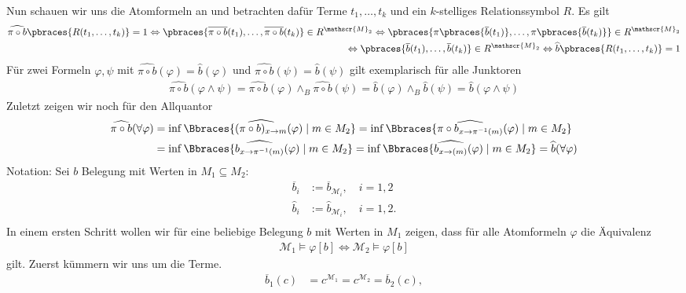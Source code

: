 \begin{solution}
	Nun schauen wir uns die Atomformeln an und betrachten dafür Terme $t_1, \dots, t_k$ und ein $k$-stelliges Relationssymbol $R$. Es gilt 
	\begin{align*}
	\widehat{\pi \circ b}\pbraces{R(t_1, \dots, t_k)} = 1 \Leftrightarrow \pbraces{\overline{\pi \circ b}(t_1), \dots, \overline{\pi \circ b}(t_k)} \in R^{\mathscr{M}_2} \Leftrightarrow \pbraces{\pi\pbraces{\overline{b}(t_1)}, \dots, \pi \pbraces{\overline{b}(t_k)}} \in R^{\mathscr{M}_2} \\
	\Leftrightarrow \pbraces{\overline{b}(t_1), \dots, \overline{b}(t_k)} \in R^{\mathscr{M}_2} \Leftrightarrow \widehat{b}\pbraces{R(t_1, \dots, t_k)} = 1
	\end{align*}
	Für zwei Formeln $\varphi, \psi$ mit $\widehat{\pi \circ b}(\varphi) = \widehat{b}(\varphi)$ und $\widehat{\pi \circ b}(\psi) = \widehat{b}(\psi)$ gilt exemplarisch für alle Junktoren
	\begin{align*}
	\widehat{\pi \circ b}(\varphi \land \psi) = \widehat{\pi \circ b}(\varphi) \land_B \widehat{\pi \circ b}(\psi) = \widehat{b}(\varphi) \land_B \widehat{b}(\psi) = \widehat{b}(\varphi \land \psi)
	\end{align*}
	Zuletzt zeigen wir noch für den Allquantor
	\begin{align*}
	\widehat{\pi \circ b}(\forall \varphi) &= \inf\Bbraces{\widehat{(\pi \circ b)_{x \to m}}(\varphi) \mid m \in M_2} = \inf\Bbraces{\widehat{\pi \circ b_{x \to \pi^{-1}(m)}}(\varphi) \mid m \in M_2} \\
	&= \inf\Bbraces{\widehat{b_{x \to \pi^{-1}(m)}}(\varphi) \mid m \in M_2} = \inf\Bbraces{\widehat{b_{x \to (m)}}(\varphi) \mid m \in M_2} = \widehat{b}(\forall \varphi)
	\end{align*}
	Notation: Sei $b$ Belegung mit Werten in $M_1 \subseteq M_2$:
	\begin{align*}
	\overline{b}_i &:= \overline{b}_{\mathscr{M}_i}, \quad i = 1,2 \\
	\hat{b}_i &:= \hat{b}_{\mathscr{M}_i}, \quad i = 1,2. \\
	\end{align*}
	In einem ersten Schritt wollen wir für eine beliebige Belegung $b$ mit Werten in $M_1$ zeigen, dass für alle Atomformeln $\varphi$ die Äquivalenz
	\begin{align*}
	\mathscr{M}_1 \vDash \varphi[b] \iff \mathscr{M}_2 \vDash \varphi[b]
	\end{align*}
	gilt. Zuerst kümmern wir uns um die Terme.
	\begin{align*}
	\overline{b}_1(c) &= c^{\mathscr{M}_1} = c^{\mathscr{M}_2} = \overline{b}_2(c), \\

\end{align*}
\end{solution}
